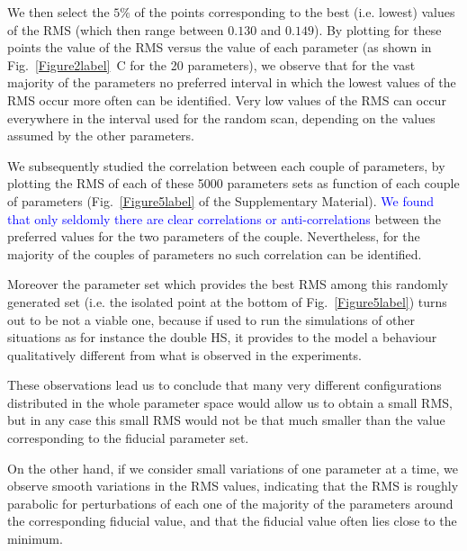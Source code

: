 \documentclass[oneside, 10pt, a4paper, twocolumn]{article}
\begin{document}
We then select the $5\%$ of the points corresponding to the best (i.e. lowest) values of the RMS (which then range between $0.130$ and $0.149$). 
By plotting for these points the value of the RMS versus the value of each parameter (as shown in Fig.~\ref{Figure2label}~C for the 20 parameters), we observe that for the vast majority of the parameters no preferred interval in which the lowest values of the RMS occur more often can be identified. Very low values of the RMS can occur everywhere in the interval used for the random scan, depending on the values assumed by the other parameters. 

We subsequently studied the correlation between each couple of parameters, by plotting the RMS of each of these 5000 parameters sets as function of each couple of parameters (Fig.~\ref{Figure5label} of the Supplementary Material). \textcolor{blue}{We found that only seldomly there are clear correlations or anti-correlations} between the preferred values for the two parameters of the couple. Nevertheless, for the majority of the couples of parameters no such correlation can be identified. 

Moreover the parameter set which provides the best RMS among this randomly generated set (i.e. the isolated point at the bottom of Fig.~\ref{Figure5label}) turns out to be not a viable one, because if used to run the simulations of other situations as for instance the double HS, it provides to the model a behaviour qualitatively different from what is observed in the experiments.

These observations lead us to conclude that many very different configurations distributed in the whole parameter space would allow us to obtain a small RMS, but in any case this small RMS would not be that much smaller than the value corresponding to the fiducial parameter set.

On the other hand, if we consider small variations of one parameter at a time, we observe smooth variations in the RMS values, indicating that the RMS is roughly parabolic for perturbations of each one of the majority of the parameters around the corresponding fiducial value, and that the fiducial value often lies close to the minimum.

\end{document}

